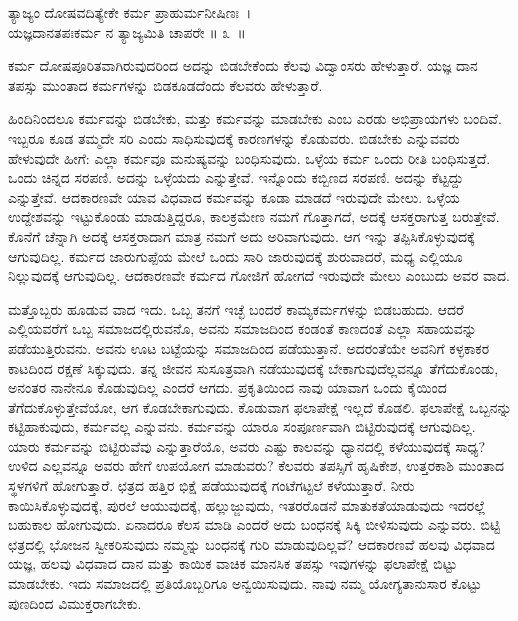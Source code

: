 \begin{shloka}
ತ್ಯಾಜ್ಯಂ ದೋಷವದಿತ್ಯೇಕೇ ಕರ್ಮ ಪ್ರಾಹುರ್ಮನೀಷಿಣಃ~।\\ಯಜ್ಞದಾನತಪಃಕರ್ಮ ನ ತ್ಯಾಜ್ಯಮಿತಿ ಚಾಪರೇ \hfill॥ ೩~॥
\end{shloka}

\begin{artha}
ಕರ್ಮ ದೋಷಪೂರಿತವಾಗಿರುವುದರಿಂದ ಅದನ್ನು ಬಿಡಬೇಕೆಂದು ಕೆಲವು ವಿದ್ವಾಂಸರು ಹೇಳುತ್ತಾರೆ. ಯಜ್ಞ ದಾನ ತಪಸ್ಸು ಮುಂತಾದ ಕರ್ಮಗಳನ್ನು ಬಿಡಕೂಡದೆಂದು ಕೆಲವರು ಹೇಳುತ್ತಾರೆ.
\end{artha}

ಹಿಂದಿನಿಂದಲೂ ಕರ್ಮವನ್ನು ಬಿಡಬೇಕು, ಮತ್ತು ಕರ್ಮವನ್ನು ಮಾಡಬೇಕು ಎಂಬ ಎರಡು ಅಭಿಪ್ರಾಯಗಳು ಬಂದಿವೆ. ಇಬ್ಬರೂ ಕೂಡ ತಮ್ಮದೇ ಸರಿ ಎಂದು ಸಾಧಿಸುವುದಕ್ಕೆ ಕಾರಣಗಳನ್ನು ಕೊಡುವರು. ಬಿಡಬೇಕು ಎನ್ನುವವರು ಹೇಳುವುದೇ ಹೀಗೆ: ಎಲ್ಲಾ ಕರ್ಮವೂ ಮನುಷ್ಯವನ್ನು ಬಂಧಿಸುವುದು. ಒಳ್ಳೆಯ ಕರ್ಮ ಒಂದು ರೀತಿ ಬಂಧಿಸುತ್ತದೆ. ಒಂದು ಚಿನ್ನದ ಸರಪಣಿ. ಅದನ್ನು ಒಳ್ಳೆಯದು ಎನ್ನುತ್ತೇವೆ. ಇನ್ನೊಂದು ಕಬ್ಬಿಣದ ಸರಪಣಿ. ಅದನ್ನು ಕೆಟ್ಟದ್ದು ಎನ್ನುತ್ತೇವೆ. ಆದಕಾರಣವೇ ಯಾವ ವಿಧವಾದ ಕರ್ಮವನ್ನು ಕೂಡಾ ಮಾಡದೆ ಇರುವುದೇ ಮೇಲು. ಒಳ್ಳೆಯ ಉದ್ದೇಶವನ್ನು ಇಟ್ಟುಕೊಂಡು ಮಾಡುತ್ತಿದ್ದರೂ, ಕಾಲಕ್ರಮೇಣ ನಮಗೆ ಗೊತ್ತಾಗದೆ, ಅದಕ್ಕೆ ಆಸಕ್ತರಾಗುತ್ತ ಬರುತ್ತೇವೆ. ಕೊನೆಗೆ ಚೆನ್ನಾಗಿ ಅದಕ್ಕೆ ಆಸಕ್ತರಾದಾಗ ಮಾತ್ರ ನಮಗೆ ಅದು ಅರಿವಾಗುವುದು. ಆಗ ಇನ್ನು ತಪ್ಪಿಸಿಕೊಳ್ಳುವುದಕ್ಕೆ ಆಗುವುದಿಲ್ಲ. ಕರ್ಮದ ಜಾರುಗುಪ್ಪೆಯ ಮೇಲೆ ಒಂದು ಸಾರಿ ಜಾರುವುದಕ್ಕೆ ಶುರುವಾದರೆ, ಮಧ್ಯ ಎಲ್ಲಿಯೂ ನಿಲ್ಲುವುದಕ್ಕೆ ಆಗುವುದಿಲ್ಲ. ಆದಕಾರಣವೇ ಕರ್ಮದ ಗೋಜಿಗೆ ಹೋಗದೆ ಇರುವುದೇ ಮೇಲು ಎಂಬುದು ಅವರ ವಾದ.

ಮತ್ತೊಬ್ಬರು ಹೂಡುವ ವಾದ ಇದು. ಒಬ್ಬ ತನಗೆ ಇಚ್ಛೆ ಬಂದರೆ ಕಾಮ್ಯಕರ್ಮಗಳನ್ನು ಬಿಡಬಹುದು. ಆದರೆ ಎಲ್ಲಿಯವರೆಗೆ ಒಬ್ಬ ಸಮಾಜದಲ್ಲಿರುವನೊ, ಅವನು ಸಮಾಜದಿಂದ ಕಂಡಂತೆ ಕಾಣದಂತೆ ಎಲ್ಲಾ ಸಹಾಯವನ್ನು ಪಡೆಯುತ್ತಿರುವನು. ಅವನು ಊಟ ಬಟ್ಟೆಯನ್ನು ಸಮಾಜದಿಂದ ಪಡೆಯುತ್ತಾನೆ. ಅದರಂತೆಯೇ ಅವನಿಗೆ ಕಳ್ಳಕಾಕರ ಕಾಟದಿಂದ ರಕ್ಷಣೆ ಸಿಕ್ಕುವುದು. ತನ್ನ ಜೀವನ ಸುಸೂತ್ರವಾಗಿ ನಡೆಯುವುದಕ್ಕೆ ಬೇಕಾಗುವುದೆಲ್ಲವನ್ನೂ ತೆಗೆದುಕೊಂಡು, ಅನಂತರ ನಾನೇನೂ ಕೊಡುವುದಿಲ್ಲ ಎಂದರೆ ಆಗದು. ಪ್ರಕೃತಿಯಿಂದ ನಾವು ಯಾವಾಗ ಒಂದು ಕೈಯಿಂದ ತೆಗೆದುಕೊಳ್ಳುತ್ತೇವೆಯೋ, ಆಗ ಕೊಡಬೇಕಾಗುವುದು. ಕೊಡುವಾಗ ಫಲಾಪೇಕ್ಷೆ ಇಲ್ಲದೆ ಕೊಡಲಿ. ಫಲಾಪೇಕ್ಷೆ ಒಬ್ಬನನ್ನು ಕಟ್ಟಿಹಾಕುವುದು, ಕರ್ಮವಲ್ಲ ಎನ್ನುವನು. ಕರ್ಮವನ್ನು ಯಾರೂ ಸಂಪೂರ್ಣವಾಗಿ ಬಿಟ್ಟಿರುವುದಕ್ಕೆ ಆಗುವುದಿಲ್ಲ. ಯಾರು ಕರ್ಮವನ್ನು ಬಿಟ್ಟಿರುವೆವು ಎನ್ನುತ್ತಾರೆಯೊ, ಅವರು ಎಷ್ಟು ಕಾಲವನ್ನು ಧ್ಯಾನದಲ್ಲಿ ಕಳೆಯುವುದಕ್ಕೆ ಸಾಧ್ಯ? ಉಳಿದ ಎಲ್ಲವನ್ನೂ ಅವರು ಹೇಗೆ ಉಪಯೋಗ ಮಾಡುವರು? ಕೆಲವರು ತಪಸ್ಸಿಗೆ ಹೃಷಿಕೇಶ, ಉತ್ತರಕಾಶಿ ಮುಂತಾದ ಸ್ಥಳಗಳಿಗೆ ಹೋಗುತ್ತಾರೆ. ಛತ್ರದ ಹತ್ತಿರ ಭಿಕ್ಷೆ ಪಡೆಯುವುದಕ್ಕೆ ಗಂಟೆಗಟ್ಟಲೆ ಕಳೆಯುತ್ತಾರೆ. ನೀರು ಕಾಯಿಸಿಕೊಳ್ಳುವುದಕ್ಕೆ, ಪುರಲೆ ಆಯುವುದಕ್ಕೆ, ಹಲ್ಲುಜ್ಜುವುದು, ಇತರ\-ರೊಡನೆ ಮಾತುಕತೆಯಾಡುವುದು ಇದರಲ್ಲೆ ಬಹುಕಾಲ ಹೋಗುವುದು. ಏನಾದರೂ ಕೆಲಸ ಮಾಡಿ ಎಂದರೆ ಅದು ಬಂಧನಕ್ಕೆ ಸಿಕ್ಕಿ ಬೀಳಿಸುವುದು ಎನ್ನುವರು. ಬಿಟ್ಟಿ ಛತ್ರದಲ್ಲಿ ಭೋಜನ ಸ್ವೀಕರಿಸುವುದು ನಮ್ಮನ್ನು ಬಂಧನಕ್ಕೆ ಗುರಿ ಮಾಡುವುದಿಲ್ಲವೆ? ಆದಕಾರಣವೆ ಹಲವು ವಿಧವಾದ ಯಜ್ಞ, ಹಲವು ವಿಧವಾದ ದಾನ ಮತ್ತು ಕಾಯಿಕ ವಾಚಿಕ ಮಾನಸಿಕ ತಪಸ್ಸು ಇವುಗಳನ್ನು ಫಲಾಪೇಕ್ಷೆ ಬಿಟ್ಟು ಮಾಡಬೇಕು. ಇದು ಸಮಾಜದಲ್ಲಿ ಪ್ರತಿಯೊಬ್ಬರಿಗೂ ಅನ್ವಯಿಸುವುದು. ನಾವು ನಮ್ಮ ಯೋಗ್ಯತಾನುಸಾರ ಕೊಟ್ಟು ಪುಣದಿಂದ ವಿಮುಕ್ತರಾಗಬೇಕು.

